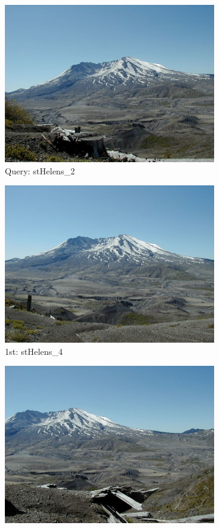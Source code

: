 \begin{itemize}
\begin{figure}[H]
	\centering
	\begin{subfigure}{0.25\textwidth}
	  \centering
	  \includegraphics[width=0.9\linewidth]{../input/stHelens_2.jpg}
	  \caption{Query: stHelens\_2}
	\end{subfigure}%
	\begin{subfigure}{0.25\textwidth}
	  \centering
	  \includegraphics[width=0.9\linewidth]{../input/stHelens_4.jpg}
	  \caption{1st: stHelens\_4}
	\end{subfigure}%
	\begin{subfigure}{0.25\textwidth}
        \centering
        \includegraphics[width=0.9\linewidth]{../input/stHelens_3.jpg}

\end{subfigure}
\end{figure}
\end{itemize}
